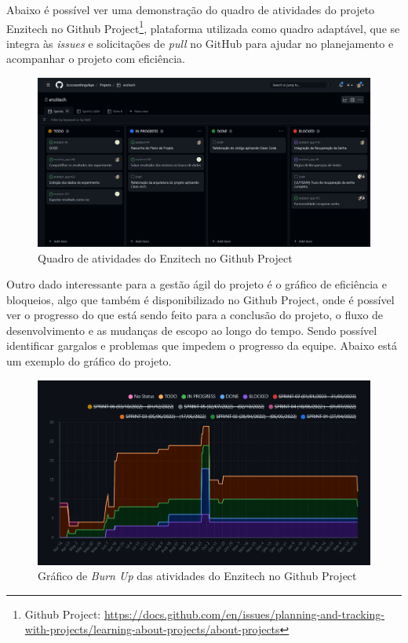 Abaixo é possível ver uma demonstração do quadro de atividades do projeto Enzitech no Github Project\footnote{\label{githubproject}Github Project: \url{https://docs.github.com/en/issues/planning-and-tracking-with-projects/learning-about-projects/about-projects}}, plataforma utilizada como quadro adaptável, que se integra às \textit{issues} e solicitações de \textit{pull} no GitHub para ajudar no planejamento e acompanhar o projeto com eficiência.

\begin{figure}[H]
\centering
  \includegraphics[width=\columnwidth]{images/quadro_projeto_github.png}
  \caption{Quadro de atividades do Enzitech no Github Project}
  \label{fig:quadro_projeto_github}
\end{figure}

Outro dado interessante para a gestão ágil do projeto é o gráfico de eficiência e bloqueios, algo que também é disponibilizado no Github Project, onde é possível ver o progresso do que está sendo feito para a conclusão do projeto, o fluxo de desenvolvimento e as mudanças de escopo ao longo do tempo. Sendo possível identificar gargalos e problemas que impedem o progresso da equipe. Abaixo está um exemplo do gráfico do projeto.

\begin{figure}[H]
\centering
  \includegraphics[width=\columnwidth]{images/grafico_projeto_github.png}
  \caption{Gráfico de \textit{Burn Up} das atividades do Enzitech no Github Project}
  \label{fig:grafico_projeto_github}
\end{figure}

